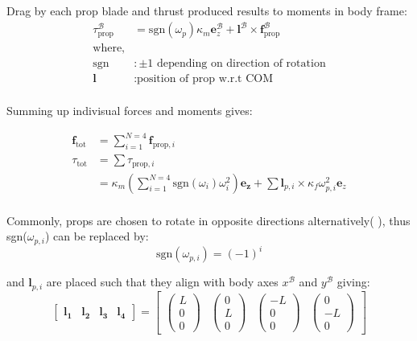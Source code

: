 Drag by each prop blade and thrust produced results to moments in body frame:
\begin{align*}
    \tau_\text{prop}^\mathcal{B} &= \text{sgn}(\omega_p) \kappa_m \mathbf{e}_z^\mathcal{B}
    + \mathbf{l}^\mathcal{B}\times \mathbf{f}_\text{prop}^\mathcal{B}\\
    \text{where,}\\
    \text{sgn} &: \pm1 \text{ depending on direction of rotation}\\
    \mathbf{l} &: \text{position of prop w.r.t COM}\\
\end{align*}

Summing up indivisual forces and moments gives:

\begin{align*}
    \mathbf{f}_\text{tot} &= \sum_{i=1}^{N=4} \mathbf{f}_{\text{prop},i}\\
    \tau_\text{tot} &= \sum \tau_{\text{prop},i}\\
    &= \kappa_m (\sum_{i=1}^{N=4} \text{sgn}(\omega_i)\omega_i^2) \mathbf{e_z} + \sum \mathbf{l}_{p,i}\times \kappa_f \omega_{p,i}^2 \mathbf{e}_z\\
\end{align*}

Commonly, props are chosen to rotate in opposite directions alternatively(\cite{tayebi2006attitude} \cite{castillo2004stabilization} \cite{lee2010geometric}), thus sgn($\omega_{p,i}$) can be replaced by:
\begin{equation*}
    \text{sgn}(\omega_{p,i}) = (-1)^i
\end{equation*}

and $\mathbf{l}_{p,i}$ are placed such that they align with body axes $x^\mathcal{B}$ and $y^\mathcal{B}$ giving:
\begin{equation*}
    \begin{bmatrix}\mathbf{l_1} & \mathbf{l_2} & \mathbf{l_3} & \mathbf{l_4} \end{bmatrix} = \begin{bmatrix}
        \begin{pmatrix}L\\0\\0\end{pmatrix} & \begin{pmatrix}0\\L\\0\end{pmatrix} & \begin{pmatrix}-L\\0\\0\end{pmatrix} & \begin{pmatrix}0\\-L\\0\end{pmatrix}
    \end{bmatrix}
\end{equation*}

